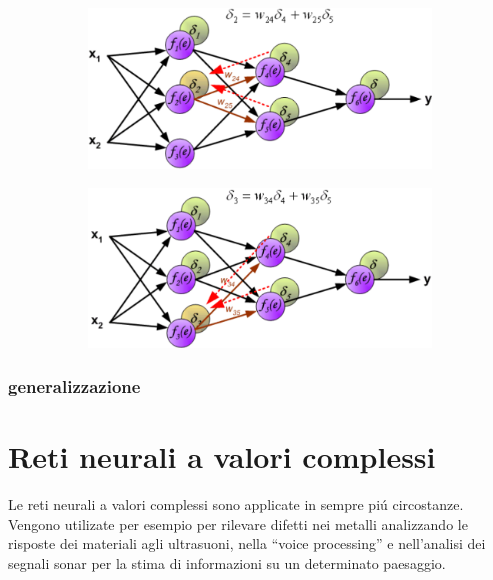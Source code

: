\documentclass[a4paper,10pt]{article}
\begin{document}
\begin{figure}[h!]
\begin{subfigure}[b]{0.3\linewidth}
  \end{subfigure}
  \begin{subfigure}[b]{0.3\linewidth}
   \includegraphics[width=\linewidth]{BackPrope.png}
  \end{subfigure}
  \begin{subfigure}[b]{0.3 \linewidth}
   \includegraphics[width=\linewidth]{BackPropf.png}
  \end{subfigure}
 \end{figure}




 
 \subsubsection{generalizzazione}
 
 \section{Reti neurali a valori complessi}
 Le reti neurali a valori complessi sono applicate in sempre pi\'u circostanze. Vengono utilizate per esempio per rilevare difetti nei metalli analizzando le risposte dei materiali agli ultrasuoni, nella ``voice processing'' e nell'analisi dei segnali sonar per la stima di informazioni su un determinato paesaggio. 
 
\end{document}
